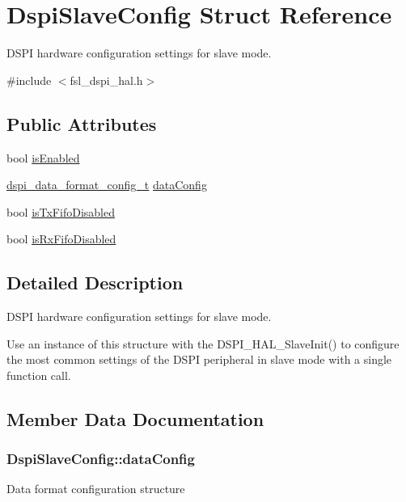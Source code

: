 \hypertarget{structDspiSlaveConfig}{}\section{Dspi\+Slave\+Config Struct Reference}
\label{structDspiSlaveConfig}


D\+S\+PI hardware configuration settings for slave mode.  




{\ttfamily \#include $<$fsl\+\_\+dspi\+\_\+hal.\+h$>$}

\subsection*{Public Attributes}
\begin{DoxyCompactItemize}
\item 
bool \hyperlink{structDspiSlaveConfig_a5ffbcd22f2cf3d37c7077bbeec5bda09}{is\+Enabled}
\item 
\hyperlink{group__dspi__hal_ga0eeb6e5b9b331a951edcf24c269bdfcd}{dspi\+\_\+data\+\_\+format\+\_\+config\+\_\+t} \hyperlink{structDspiSlaveConfig_adcf7d1b1459b3bbb29dda94959865a13}{data\+Config}
\item 
bool \hyperlink{structDspiSlaveConfig_a65f1d87361fb1474f06f39ce29227e44}{is\+Tx\+Fifo\+Disabled}
\item 
bool \hyperlink{structDspiSlaveConfig_a43ae46356c2bd0ee4655d14a8ed4bff9}{is\+Rx\+Fifo\+Disabled}
\end{DoxyCompactItemize}


\subsection{Detailed Description}
D\+S\+PI hardware configuration settings for slave mode. 

Use an instance of this structure with the D\+S\+P\+I\+\_\+\+H\+A\+L\+\_\+\+Slave\+Init() to configure the most common settings of the D\+S\+PI peripheral in slave mode with a single function call. 

\subsection{Member Data Documentation}
\subsubsection[{\texorpdfstring{data\+Config}{dataConfig}}]{ Dspi\+Slave\+Config\+::data\+Config}\hypertarget{structDspiSlaveConfig_adcf7d1b1459b3bbb29dda94959865a13}{}\label{structDspiSlaveConfig_adcf7d1b1459b3bbb29dda94959865a13}
Data format configuration structure 
